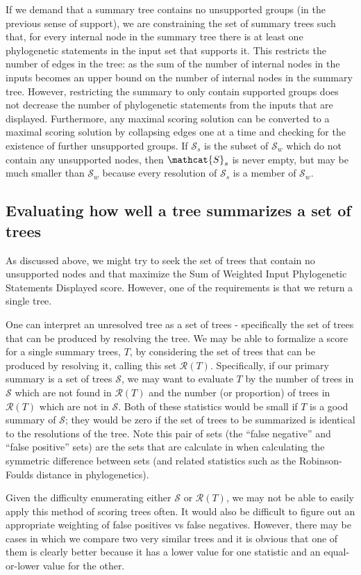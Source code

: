 \documentclass[11pt]{article}
\newcommand{\pss}{phylogenetic statements\xspace}
\newcommand{\PSs}{Phylogenetic Statements\xspace}
\newcommand{\SWIPSD}{Sum of Weighted Input \PSs Displayed\xspace}
\begin{document}
If we demand that a summary tree contains no unsupported groups (in the previous sense of support), we 
    are constraining the set of summary trees such that, for every internal node in the summary tree
    there is at least one \pss in the input set that supports it.
This restricts the number of edges in the tree: as the sum of the number of internal nodes in the inputs becomes an upper bound
    on the number of internal nodes in the summary tree.
However, restricting the summary to only contain supported groups does not decrease the 
    number of \pss from the inputs that are displayed.
Furthermore, any maximal scoring solution can be converted to a maximal scoring
    solution by collapsing edges one at a time and checking for the existence of further
    unsupported groups.
If $\mathcal{S}_s$ is the subset of $\mathcal{S}_w$ which do not contain any unsupported nodes,
    then $\mathcat{S}_s$ is never empty, but may be much smaller than $\mathcal{S}_w$ because
    every resolution of $\mathcal{S}_s$ is a member of $\mathcal{S}_w$.

\subsection{Evaluating how well a tree summarizes a set of trees}
As discussed above, we might try to seek the set of trees that contain no unsupported nodes and that
    maximize the \SWIPSD score.
However, one of the requirements is that we return a single tree.

One can interpret an unresolved tree as a set of trees - specifically the set of trees that 
    can be produced by resolving the tree.
We may be able to formalize a score for a single summary trees, $T$, by considering
    the set of trees that can be produced by resolving it, calling this set $\mathcal{R}(T)$.
Specifically, if our primary summary is a set of trees $\mathcal{S}$, we may want
    to evaluate $T$ by the number of trees in $\mathcal{S}$ which are not found
    in $\mathcal{R}(T)$ 
    and the number (or proportion) of trees in $\mathcal{R}(T)$ which
    are not in $\mathcal{S}$.
Both of these statistics would be small if $T$ is a good summary of $\mathcal{S}$; they 
    would be zero if the set of trees to be summarized is identical to the resolutions
    of the tree.
Note this pair of sets (the ``false negative'' and ``false positive'' sets) are the
    sets that are calculate in when calculating the symmetric difference between 
    sets (and related statistics such as the Robinson-Foulds distance in phylogenetics).

Given the difficulty enumerating either $\mathcal{S}$ or $\mathcal{R}(T)$, we may not be able to easily 
    apply this method of scoring trees often.
It would also be difficult to figure out an appropriate weighting of false positives vs false negatives.
However, there may be cases in which we compare two very similar trees and it is obvious
    that one of them is clearly better because it has a lower value for one statistic and an equal-or-lower
    value for the other.




\end{document}
